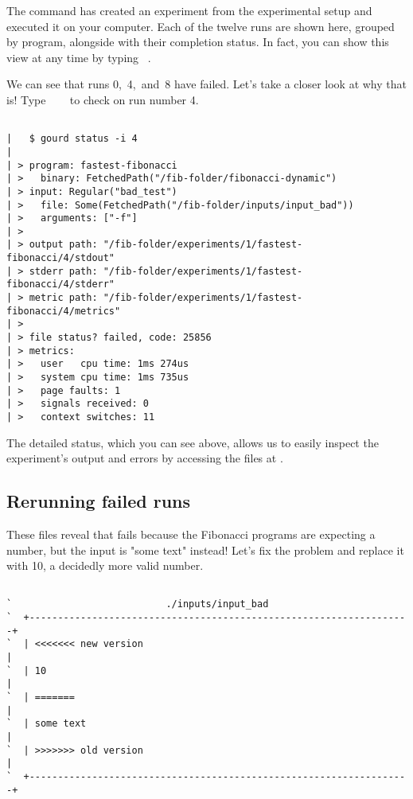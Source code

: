 \documentclass[a4paper,english]{article}
\begin{document}
\begin{adjustwidth}{18pt}{0pt}
    The  command has created an experiment from the experimental setup and executed it on your computer.
    Each of the twelve runs are shown here, grouped by program, alongside with their completion status.
    In fact, you can show this view at any time by typing ~.

    We can see that runs 0,~4,~and~8 have failed.
    Let's take a closer look at why that is!
    Type ~~~ to check on run number 4.

    \begin{verbatim}

|   $ gourd status -i 4
|
| > program: fastest-fibonacci
| >   binary: FetchedPath("/fib-folder/fibonacci-dynamic")
| > input: Regular("bad_test")
| >   file: Some(FetchedPath("/fib-folder/inputs/input_bad"))
| >   arguments: ["-f"]
| >
| > output path: "/fib-folder/experiments/1/fastest-fibonacci/4/stdout"
| > stderr path: "/fib-folder/experiments/1/fastest-fibonacci/4/stderr"
| > metric path: "/fib-folder/experiments/1/fastest-fibonacci/4/metrics"
| >
| > file status? failed, code: 25856
| > metrics:
| >   user   cpu time: 1ms 274us
| >   system cpu time: 1ms 735us
| >   page faults: 1
| >   signals received: 0
| >   context switches: 11

    \end{verbatim}

    The detailed status, which you can see above, allows us to easily inspect
    the experiment's output and errors by accessing the files at
    .

    \subsection{Rerunning failed runs}

    These files reveal that  fails because the Fibonacci
    programs are expecting a number, but the input is "some text" instead!
    Let's fix the problem and replace it with 10, a decidedly more valid number.

    \begin{verbatim}

`                           ./inputs/input_bad
`  +-------------------------------------------------------------------+
`  | <<<<<<< new version                                               |
`  | 10                                                                |
`  | =======                                                           |
`  | some text                                                         |
`  | >>>>>>> old version                                               |
`  +-------------------------------------------------------------------+


\end{verbatim}
\end{adjustwidth}
\end{document}
